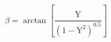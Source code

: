 \documentclass[12pt]{article}
\begin{document}
\begin{displaymath}
\beta=\arctan \left[\frac{\mathrm{Y}}{\left(1-\mathrm{Y}^{2}\right)^{0.5}}\right]
\end{displaymath}
\end{document}
